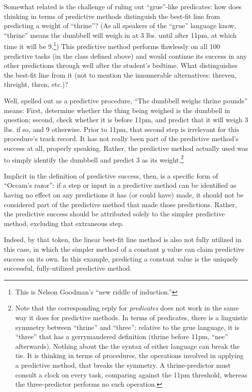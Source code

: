 \documentclass[
  letterpaper,
  DIV=11,
  numbers=noendperiod]{scrartcl}
\theoremstyle{definition}
\theoremstyle{remark}
\begin{document}
Somewhat related is the challenge of ruling out ``grue''-like
predicates: how does thinking in terms of predictive methods distinguish
the best-fit line from predicting a weight of ``thrine''? (As all
speakers of the ``grue'' language know, ``thrine'' means the dumbbell
will weigh in at 3 lbs. until after 11pm, at which time it will be
9.\footnote{This is Nelson Goodman's ``new riddle of induction.''}) This
predictive method performs flawlessly on all 100 predictive tasks (in
the class defined above) and would continue its success in any other
predictions through well after the student's bedtime. What distinguishes
the best-fit line from it (not to mention the innumerable alternatives:
threven, threight, thren, etc.)?

Well, spelled out as a predictive procedure, ``The dumbbell weighs
thrine pounds'' means: First, determine whether the thing being weighed
is the dumbbell in question; second, check whether it is before 11pm,
and predict that it will weigh 3 lbs. if so, and 9 otherwise. Prior to
11pm, that second step is irrelevant for this procedure's track record.
It has not really been part of the predictive method's success at all,
properly speaking. Rather, the predictive method actually used was to
simply identify the dumbbell and predict 3 as its weight.\footnote{Note
  that the corresponding reply for \emph{predicates} does not work in
  the same way it does for predictive methods. In terms of predicates,
  there is a linguistic symmetry between ``thrine'' and ``three'':
  relative to the grue language, it is ``three'' that has a
  gerrymandered definition (thrine before 11pm, ``nee'' afterwards).
  Nothing about the the syntax of either language can break the tie. It
  is thinking in terms of procedures, the operations involved in
  applying a predictive method, that breaks the symmetry. A
  thrine-predictor must consult a clock on every task, comparing against
  the 11pm threshold, whereas the three-predictor performs no such
  operation.}

Implicit in the definition of predictive success, then, is a specific
form of ``Occam's razor'': if a step or input in a predictive method can
be identified as having no effect on any predictions it has (or could
have) made, it should not be considered part of the predictive method
that made those predictions. Rather, the predictive success should be
attributed solely to the simpler predictive method, excluding that
extraneous step.

Indeed, by that token, the linear best-fit line method is also not fully
utilized in this case, in which the simpler method of a constant \(y\)
value can claim predictive success on its own. In this example,
predicting a constant value is the uniquely successful, fully-utilized
predictive method.
\end{document}

